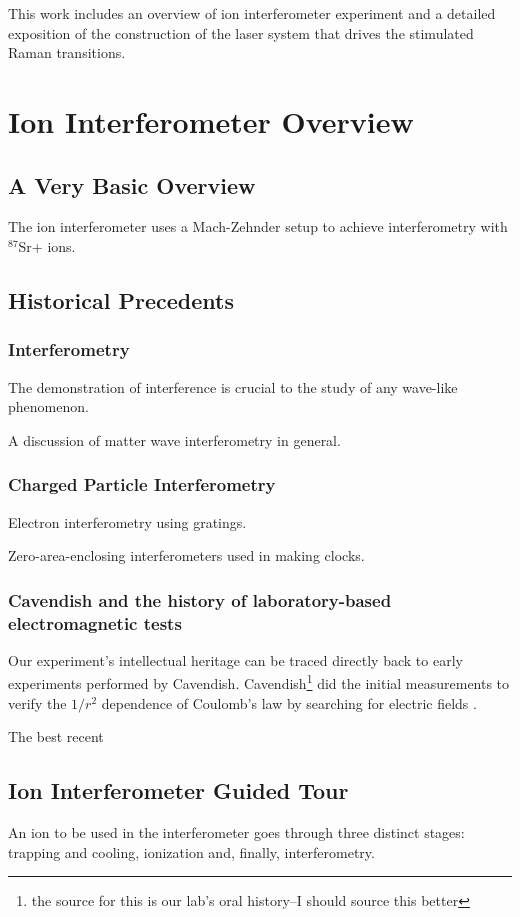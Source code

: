 This work includes an overview of ion interferometer experiment and a detailed exposition of the construction of the laser system that drives the stimulated Raman transitions.


\chapter{Ion Interferometer Overview}

\section{A Very Basic Overview}
The ion interferometer uses a Mach-Zehnder setup to achieve interferometry with $^{87}$Sr+ ions.
\section{Historical Precedents}
 \subsection{Interferometry}
  The demonstration of interference is crucial to the study of any wave-like phenomenon. 

  A discussion of matter wave interferometry in general. 
  \subsection{Charged Particle Interferometry}
  Electron interferometry using gratings. 

Zero-area-enclosing interferometers used in making clocks. 
\subsection{Cavendish and the history of laboratory-based electromagnetic tests}
  Our experiment's intellectual heritage can be traced directly back to early experiments performed by Cavendish. Cavendish\footnote{the source for this is our lab's oral history--I should source this better} did the initial measurements to verify the $1/r^2$ dependence of Coulomb's law by searching for electric fields \cite{jackson}. 

The best recent
\section{Ion Interferometer Guided Tour}
An ion to be used in the interferometer goes through three distinct stages: trapping and cooling, ionization and, finally, interferometry. 

